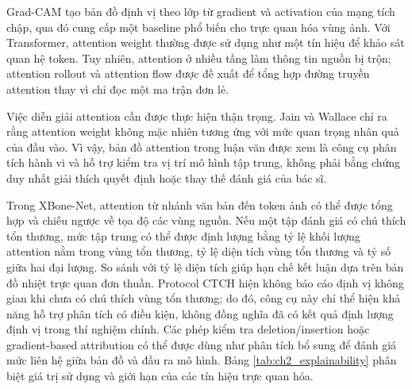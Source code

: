 Grad-CAM \cite{Selvaraju2017GradCAM} tạo bản đồ định vị theo lớp từ gradient và activation của mạng tích chập, qua đó cung cấp một baseline phổ biến cho trực quan hóa vùng ảnh. Với Transformer, attention weight thường được sử dụng như một tín hiệu để khảo sát quan hệ token. Tuy nhiên, attention ở nhiều tầng làm thông tin nguồn bị trộn; attention rollout và attention flow \cite{Abnar2020AttentionFlow} được đề xuất để tổng hợp đường truyền attention thay vì chỉ đọc một ma trận đơn lẻ.

Việc diễn giải attention cần được thực hiện thận trọng. Jain và Wallace \cite{Jain2019AttentionNotExplanation} chỉ ra rằng attention weight không mặc nhiên tương ứng với mức quan trọng nhân quả của đầu vào. Vì vậy, bản đồ attention trong luận văn được xem là công cụ phân tích hành vi và hỗ trợ kiểm tra vị trí mô hình tập trung, không phải bằng chứng duy nhất giải thích quyết định hoặc thay thế đánh giá của bác sĩ.

Trong XBone-Net, attention từ nhánh văn bản đến token ảnh có thể được tổng hợp và chiếu ngược về tọa độ các vùng nguồn. Nếu một tập đánh giá có chú thích tổn thương, mức tập trung có thể được định lượng bằng tỷ lệ khối lượng attention nằm trong vùng tổn thương, tỷ lệ diện tích vùng tổn thương và tỷ số giữa hai đại lượng. So sánh với tỷ lệ diện tích giúp hạn chế kết luận dựa trên bản đồ nhiệt trực quan đơn thuần. Protocol CTCH hiện không báo cáo định vị không gian khi chưa có chú thích vùng tổn thương; do đó, công cụ này chỉ thể hiện khả năng hỗ trợ phân tích có điều kiện, không đồng nghĩa đã có kết quả định lượng định vị trong thí nghiệm chính. Các phép kiểm tra deletion/insertion hoặc gradient-based attribution có thể được dùng như phân tích bổ sung để đánh giá mức liên hệ giữa bản đồ và đầu ra mô hình. Bảng \ref{tab:ch2_explainability} phân biệt giá trị sử dụng và giới hạn của các tín hiệu trực quan hóa.

